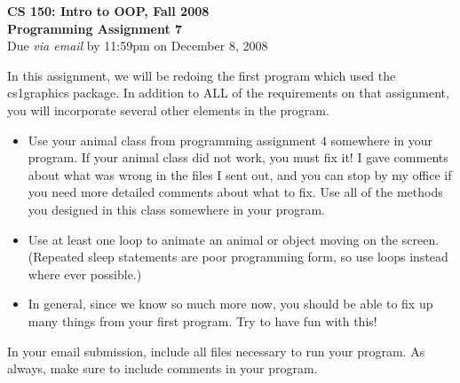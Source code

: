 \documentclass[11pt]{article}
\begin{document}

\begin{center}
\LARGE \textbf{CS 150: Intro to OOP, Fall 2008}
\\
\textbf{Programming Assignment 7}
\\[1ex]
\Large Due \emph{via email} by 11:59pm on December 8, 2008\\

\end{center}


In this assignment, we will be redoing the first program which used
the cs1graphics package.  In addition to ALL of the requirements on
that assignment, you will incorporate several other elements in the
program.

\begin{itemize}
\item Use your animal class from programming assignment 4 somewhere
in your program.  If your animal class did not work, you must fix
it!  I gave comments about what was wrong in the files I sent out,
and you can stop by my office if you need more detailed comments
about what to fix.  Use all of the methods you designed in this
class somewhere in your program.

\item Use at least one loop to animate an animal or object moving on
the screen.  (Repeated sleep statements are poor programming form,
so use loops instead where ever possible.)

\item In general, since we know so much more now, you should be able
to fix up many things from your first program.  Try to have fun with
this!

\end{itemize}

In your email submission, include all files necessary to run your
program.  As always, make sure to include comments in your program.
\end{document}

